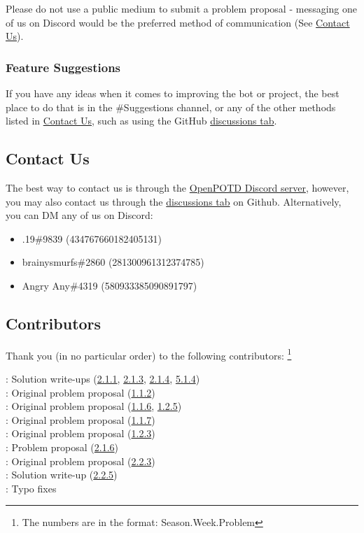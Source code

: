 Please do not use a public medium to submit a problem proposal - messaging one of us on Discord would
 be the preferred method of communication (See \hyperref[sec:contact]{Contact Us}).\medskip

\subsubsection*{Feature Suggestions} 
\label{sec:suggestions}

If you have any ideas when it comes to improving the bot or project, the best place to do that is in the {\selectfont \#Suggestions} channel, or any of the other methods listed in \hyperref[sec:contact]{Contact Us}, such as using the GitHub \href{https://github.com/OpenPOTD/Solutions/discussions}{discussions tab}.\medskip

\subsection*{Contact Us}
\label{sec:contact} 

The best way to contact us is through the \href{https://discord.gg/GsPSSHdhPB}{OpenPOTD Discord server}, 
however, you may also contact us through the \href{https://github.com/OpenPOTD/Solutions/discussions}{discussions tab} on Github.
 Alternatively, you can DM any of us on Discord:

 \begin{itemize}
     \item .19\#9839 (434767660182405131)
     \item brainysmurfs\#2860 (281300961312374785)
     \item Angry Any\#4319 (580933385090891797)
 \end{itemize}
 \medskip

\subsection*{Contributors}
\label{sec:contributors}

Thank you (in no particular order) to the following contributors:
\footnote{The numbers are in the format: Season.Week.Problem}\medskip

\Paiya: Solution write-ups (\hyperref[2-1-1]{2.1.1}, \hyperref[2-1-3]{2.1.3}, \hyperref[2-1-4]{2.1.4}, \hyperref[5-1-4]{5.1.4})\\
\Ptony: Original problem proposal (\hyperref[1-1-2]{1.1.2})\\
\Ppi: Original problem proposal (\hyperref[1-1-6]{1.1.6}, \hyperref[1-2-5]{1.2.5})\\
\Pbfan: Original problem proposal (\hyperref[1-1-7]{1.1.7})\\
\Pkiesh: Original problem proposal (\hyperref[1-2-3]{1.2.3})\\
\Pchris: Problem proposal (\hyperref[2-1-6]{2.1.6})\\
\Pkee: Original problem proposal (\hyperref[2-2-3]{2.2.3})\\
\PSlas: Solution write-up (\hyperref[2-2-5]{2.2.5})\\
\Parjun: Typo fixes
